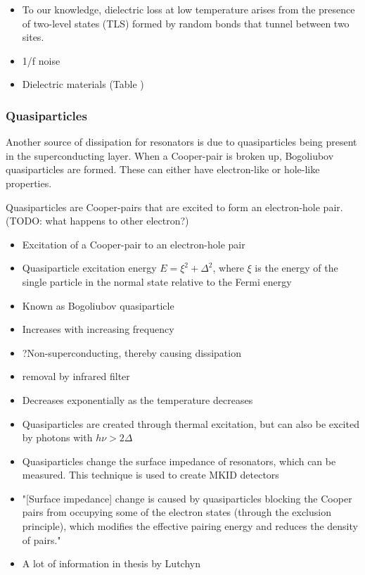 \documentclass[12pt]{report}
\begin{document}
\begin{itemize}
    \item To our knowledge, dielectric loss at low temperature
        arises from the presence of two-level states (TLS) formed
        by random bonds that tunnel between two sites. \cite{martinis2014ucsb}
    \item 1/f noise \cite{burnett2013evidence}
    \item Dielectric materials (Table \cite{martinis2014ucsb})
\end{itemize}



\subsubsection{Quasiparticles}

Another source of dissipation for resonators is due to quasiparticles being present in the superconducting layer. When a Cooper-pair is broken up, Bogoliubov quasiparticles are formed. These can either have electron-like or hole-like properties.

Quasiparticles are Cooper-pairs that are excited to form an electron-hole pair. (TODO: what happens to other electron?)

\begin{itemize}
    \item Excitation of a Cooper-pair to an electron-hole pair
    \item Quasiparticle excitation energy $E = \xi^2 + \Delta ^2$,
        where $\xi$ is the energy of the single particle in the normal state relative to the Fermi energy \cite{Barends}
    \item Known as Bogoliubov quasiparticle
    \item Increases with increasing frequency
    \item ?Non-superconducting, thereby causing dissipation
    \item removal by infrared filter
    \item Decreases exponentially as the temperature decreases \cite[p.~19?]{Mazin}
    \item Quasiparticles are created through thermal excitation, but can also be excited by photons with $h \nu > 2 \Delta$\cite{Gao}
    \item Quasiparticles change the surface impedance of resonators, which can be measured.
        This technique is used to create MKID detectors \cite{Gao}
    \item "[Surface impedance] change is caused by quasiparticles blocking
        the Cooper pairs from occupying some of the electron states (through the exclusion principle), which
        modifies the effective pairing energy and reduces the density of pairs."\cite[p.~3]{Mazin}
    \item A lot of information in thesis by Lutchyn \cite{Lutchyn}
\end{itemize}
\end{document}
